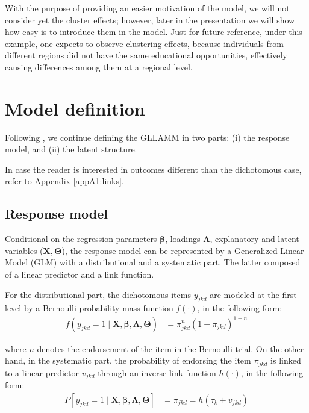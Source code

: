 With the purpose of providing an easier motivation of the model, we will not consider yet the cluster effects; however, later in the presentation we will show how easy is to introduce them in the model. Just for future reference, under this example, one expects to observe clustering effects, because individuals from different regions did not have the same educational opportunities, effectively causing differences among them at a regional level.


\section{Model definition} \label{sect:definition}

Following \citet{Rabe_et_al_2004a, Rabe_et_al_2004b}, we continue defining the GLLAMM in two parts: (i) the response model, and (ii) the latent structure.

In case the reader is interested in outcomes different than the dichotomous case, refer to Appendix \ref{appA1:links}.

\subsection{Response model} \label{s_sect:response}

Conditional on the regression parameters $\pmb{\beta}$, loadings $\pmb{\Lambda}$, explanatory and latent variables ($\mathbf{X},  \pmb{\Theta}$), the response model can be represented by a Generalized Linear Model (GLM) \cite{Nelder_et_al_1972, Nelder_et_al_1989} with a distributional and a systematic part. The latter composed of a linear predictor and a link function.

For the distributional part, the dichotomous items $y_{jkd}$ are modeled at the first level by a Bernoulli probability mass function $f(\cdot)$, in the following form:
\begin{equation} \label{eq:distributional}
	\begin{split}
		f \left( y_{jkd}=1 \; | \; \mathbf{X}, \pmb{\beta}, \pmb{\Lambda}, \pmb{\Theta} \right) &= \pi_{jkd}^{n} (1 - \pi_{jkd})^{1-n}
	\end{split}
\end{equation}

\noindent where $n$ denotes the endorsement of the item in the Bernoulli trial. On the other hand, in the systematic part, the probability of endorsing the item $\pi_{jkd}$ is linked to a linear predictor $v_{jkd}$ through an inverse-link function $h(\cdot)$, in the following form:
\begin{equation} \label{eq:systematic}
	\begin{split}
		P\left[ y_{jkd}=1 \; | \; \mathbf{X}, \pmb{\beta}, \pmb{\Lambda}, \pmb{\Theta} \right] &= \pi_{jkd} = h( \tau_{k} + v_{jkd} )
	\end{split}	
\end{equation}

